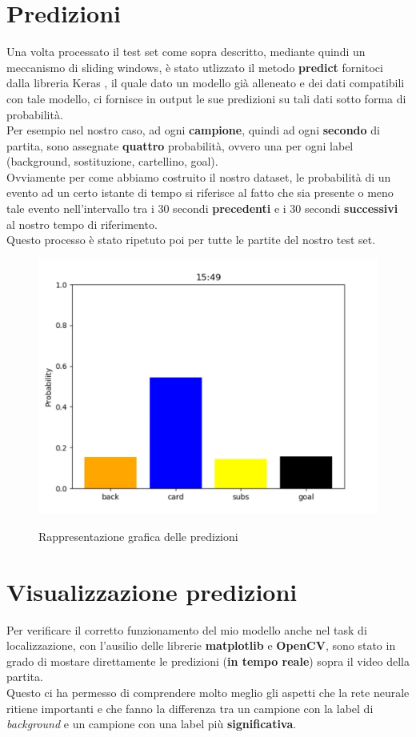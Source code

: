 \section{Predizioni}
Una volta processato il test set come sopra descritto, mediante quindi un meccanismo di sliding windows, è stato utlizzato il metodo \textbf{predict} fornitoci dalla libreria Keras \cite{chollet2015keras}, il quale dato un modello già alleneato e dei dati compatibili con tale modello, ci fornisce in output le sue predizioni su tali dati sotto forma di probabilità. 
\\Per esempio nel nostro caso, ad ogni \textbf{campione}, quindi ad ogni \textbf{secondo} di partita, sono assegnate \textbf{quattro} probabilità, ovvero una per ogni label (background, sostituzione, cartellino, goal).
\\Ovviamente per come abbiamo costruito il nostro dataset, le probabilità di un evento ad un certo istante di tempo si riferisce al fatto che sia presente o meno tale evento nell'intervallo tra i 30 secondi \textbf{precedenti} e i 30 secondi \textbf{successivi} al nostro tempo di riferimento.
\\Questo processo è stato ripetuto poi per tutte le partite del nostro test set.
\begin{figure}[ht]
\centering
\caption{Rappresentazione grafica delle predizioni}
\includegraphics[width=\linewidth]{img/predict.png}
\label{figure : predict}
\end{figure}
\section{Visualizzazione predizioni}
Per verificare il corretto funzionamento del mio modello anche nel task di localizzazione, con l'ausilio delle librerie \textbf{matplotlib} e \textbf{OpenCV}, sono stato in grado di mostare direttamente le predizioni (\textbf{in tempo reale}) sopra il video della partita.
\\Questo ci ha permesso di comprendere molto meglio gli aspetti che la rete neurale ritiene importanti e che fanno la differenza tra un campione con la label di \textit{background} e un campione con una label più \textbf{significativa}.

